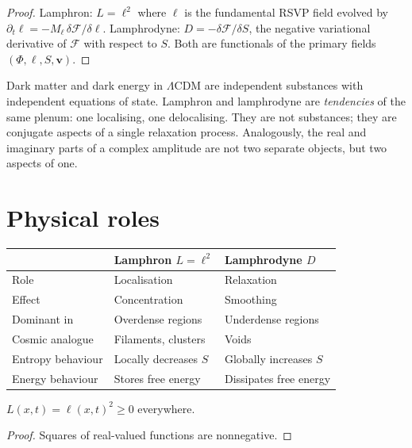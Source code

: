 \begin{proof}
  Lamphron: $L = \ell^2$ where $\ell$ is the fundamental RSVP
  field evolved by $\partial_t\ell = -M_\ell\,\delta\mathcal{F}/\delta\ell$.
  Lamphrodyne: $D = -\delta\mathcal{F}/\delta S$, the negative
  variational derivative of $\mathcal{F}$ with respect to $S$.
  Both are functionals of the primary fields $(\Phi, \ell, S, \mathbf{v})$.
\end{proof}

\begin{InterpBox}
  Dark matter and dark energy in $\Lambda$CDM are independent
  substances with independent equations of state.
  Lamphron and lamphrodyne are \emph{tendencies} of the same
  plenum: one localising, one delocalising.
  They are not substances; they are conjugate aspects of a
  single relaxation process.
  Analogously, the real and imaginary parts of a complex
  amplitude are not two separate objects, but two aspects
  of one.
\end{InterpBox}

\section{Physical roles}

\begin{center}
\begin{tabular}{@{}lll@{}}
\toprule
& \textbf{Lamphron} $L = \ell^2$ & \textbf{Lamphrodyne} $D$ \\
\midrule
Role & Localisation & Relaxation \\
Effect & Concentration & Smoothing \\
Dominant in & Overdense regions & Underdense regions \\
Cosmic analogue & Filaments, clusters & Voids \\
Entropy behaviour & Locally decreases $S$ & Globally increases $S$ \\
Energy behaviour & Stores free energy & Dissipates free energy \\
\bottomrule
\end{tabular}
\end{center}

\begin{proposition}
  \label{prop:lamphron-pos2}
  \statusproven{}
  $L(x,t) = \ell(x,t)^2 \geq 0$ everywhere.
\end{proposition}

\begin{proof}
  Squares of real-valued functions are nonnegative.
\end{proof}

